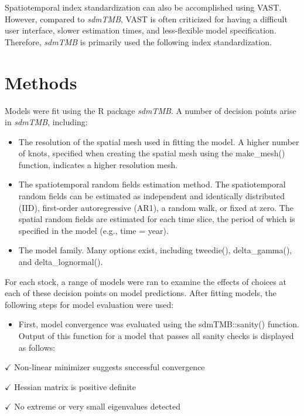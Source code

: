 \documentclass[
]{article}
\providecommand{\tightlist}{%
  \setlength{\itemsep}{0pt}\setlength{\parskip}{0pt}}
\begin{document}
Spatiotemporal index standardization can also be accomplished using VAST. However, compared to \emph{sdmTMB}, VAST is often criticized for having a difficult user interface, slower estimation times, and less-flexible model specification. Therefore, \emph{sdmTMB} is primarily used the following index standardization.

\section*{Methods}\label{methods}

Models were fit using the R package \emph{sdmTMB}. A number of decision points arise in \emph{sdmTMB}, including:

\begin{itemize}
\item
  The resolution of the spatial mesh used in fitting the model. A higher number of knots, specified when creating the spatial mesh using the make\_mesh() function, indicates a higher resolution mesh.
\item
  The spatiotemporal random fields estimation method. The spatiotemporal random fields can be estimated as independent and identically distributed (IID), first-order autoregressive (AR1), a random walk, or fixed at zero. The spatial random fields are estimated for each time slice, the period of which is specified in the model (e.g., time = year).
\item
  The model family. Many options exist, including tweedie(), delta\_gamma(), and delta\_lognormal().
\end{itemize}

For each stock, a range of models were ran to examine the effects of choices at each of these decision points on model predictions. After fitting models, the following steps for model evaluation were used:

\begin{itemize}
\tightlist
\item
  First, model convergence was evaluated using the sdmTMB::sanity() function. Output of this function for a model that passes all sanity checks is displayed as follows:
\end{itemize}

\(\checkmark\) Non-linear minimizer suggests successful convergence

\(\checkmark\) Hessian matrix is positive definite

\(\checkmark\) No extreme or very small eigenvalues detected
\end{document}
